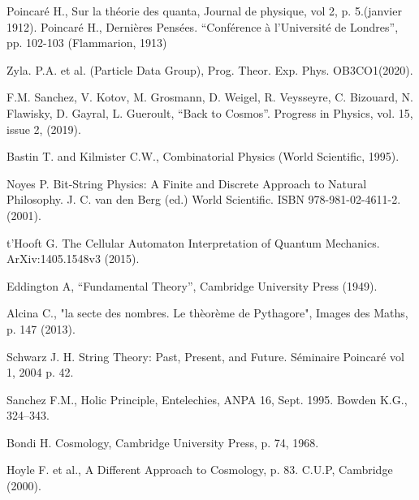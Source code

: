 \documentclass[a4paper,9pt]{article}
\begin{document}
  
\begin{thebibliography}{99}


 Poincaré H., Sur la théorie des quanta, Journal de physique, vol 2, p. 5.(janvier 1912).
 Poincaré H., Dernières Pensées. “Conférence à l’Université de Londres”, pp. 102-103 (Flammarion, 1913)

 Zyla. P.A. et al. (Particle Data Group), Prog. Theor. Exp. Phys. OB3CO1(2020).

 F.M. Sanchez, V. Kotov, M. Grosmann, D. Weigel, R. Veysseyre, C. Bizouard, N. Flawisky, D. Gayral, L. Gueroult, ``Back to Cosmos''. Progress in Physics, vol. 15, issue 2, (2019).

 Bastin T. and Kilmister C.W., Combinatorial Physics (World Scientific, 1995).

 Noyes P. Bit-String Physics: A Finite and Discrete Approach to Natural Philosophy. J. C. van den Berg (ed.) World Scientific. ISBN 978-981-02-4611-2. (2001).

 t'Hooft G. The Cellular Automaton Interpretation of Quantum Mechanics. ArXiv:1405.1548v3 (2015).

 Eddington A, ``Fundamental Theory'', Cambridge University Press (1949).

 Alcina C., "la secte des nombres. Le thèorème de Pythagore", Images des Maths, p. 147 (2013).

 Schwarz J. H. String Theory: Past, Present, and Future. Séminaire Poincaré vol 1, 2004 p. 42.


 Sanchez F.M., Holic Principle, Entelechies, ANPA 16, Sept. 1995. Bowden K.G., 324--343.



 Bondi H. Cosmology, Cambridge University Press, p. 74, 1968.

 Hoyle F. et al., A Different Approach to Cosmology, p. 83. C.U.P, Cambridge (2000).



\end{thebibliography}
\end{document}
